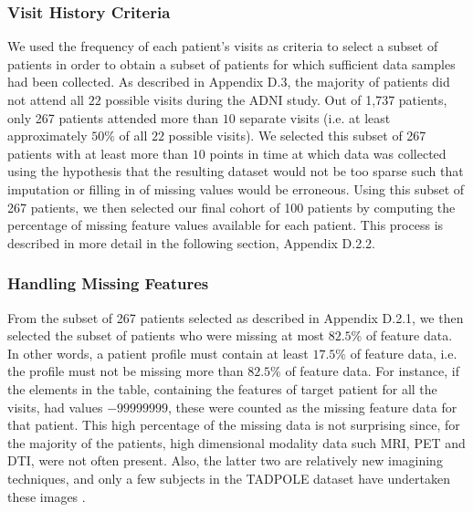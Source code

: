 \documentclass{article}
\begin{document}
 \subsubsection{Visit History Criteria}
We used the frequency of each patient's visits as criteria to select a subset of patients in order to obtain a subset of patients for which sufficient data samples had been collected. As described in Appendix D.3, the majority of patients did not attend all $22$ possible visits during the ADNI study. Out of 1,737 patients, only 267 patients attended more than $10$ separate visits (i.e. at least approximately $50\%$ of all $22$ possible visits). We selected this subset of 267 patients with at least more than $10$ points in time at which data was collected using the hypothesis that the resulting dataset would not be too sparse such that imputation or filling in of missing values would be erroneous. Using this subset of 267 patients, we then selected our final cohort of 100 patients by computing the percentage of missing feature values available for each patient. This process is described in more detail in the following section, Appendix D.2.2.
 
 \subsubsection{Handling Missing Features}
From the subset of 267 patients selected as described in Appendix D.2.1, we then selected the subset of patients who were missing at most $82.5\%$ of feature data. In other words, a patient profile must contain at least $17.5\%$ of feature data, i.e. the profile must not be missing more than $82.5\%$ of feature data. For instance, if the elements in the table, containing the features of target patient for all the visits, had values $-99999999$, these were counted as the missing feature data for that patient. This high percentage of the missing data is not surprising since, for the majority of the patients, high dimensional modality data such MRI, PET and DTI, were not often present. Also, the latter two are relatively new imagining techniques, and only a few subjects in the TADPOLE dataset have undertaken these images \cite{tadpole2017}.

\end{document}
